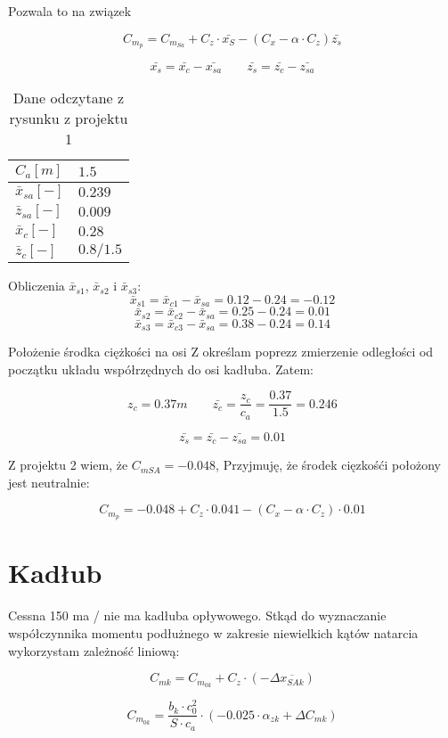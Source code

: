 \documentclass[a4paper, twoside]{report}
\begin{document}
Pozwala to na związek

$$
C_{m_p} = C_{m_{Sa}}+ C_z\cdot \bar{x_S}-(C_x - \alpha \cdot C_z) \bar{z_s} 
$$

$$
\bar{x_s} = \bar{x_c} - \bar{x_{sa}} \qquad \bar{z_s} = \bar{z_c} - \bar{z_{sa}}
$$
\FloatBarrier
\begin{table}[h!]
\centering
\caption{Dane odczytane z rysunku z  projektu 1}
\begin{tabular}{|l|l|} 
\hline
$C_a [m]$         & $1.5$      \\ 
\hline
$\bar x_{sa} [-]$ & $0.239$    \\ 
\hline
$\bar z_{sa} [-]$ & $0.009$    \\ 
\hline
$\bar x_{c} [-]$  & $0.28$     \\ 
\hline
$\bar z_{c} [-]$  & $0.8/1.5$  \\
\hline
\end{tabular}
\end{table}


Obliczenia $\bar{x}_{s1}$, $\bar{x}_{s2}$ i $\bar{x}_{s3}$:
\[
\bar x_{s1} =	\bar x_{c1} -\bar x_ {sa} = 0.12 - 0.24 = -0.12 
\]
\[
\bar x_{s2} =	\bar x_{c2} -\bar x_ {sa} = 0.25 - 0.24 =  0.01
\]
\[
\bar x_{s3} =	\bar x_{c3} -\bar x_ {sa} = 0.38 - 0.24 = 0.14 
\]

Położenie środka ciężkości na osi Z określam poprezz zmierzenie odległości od początku układu współrzędnych do osi kadłuba. Zatem:

$$
z_c = 0.37m \qquad \bar{z_c} =\frac{z_c}{c_a} = \frac{0.37}{1.5} = 0.246
$$

$$
\bar{z_s} = \bar{z_c} - \bar{z_{sa}} = 0.01
$$

Z projektu 2 wiem, że $C_{mSA} = - 0.048$, Przyjmuję, że środek cięzkośći położony jest neutralnie:

$$
C_{m_p} = -0.048+C_z \cdot 0.041 - (C_x - \alpha \cdot C_z)\cdot 0.01
$$

\section{Kadłub} 

Cessna 150 ma / nie ma kadłuba opływowego. Stkąd do wyznaczanie współczynnika momentu podłużnego w zakresie niewielkich kątów natarcia wykorzystam zależność liniową:

$$
C_{mk} = C_{m_{0k}}+ C_z\cdot (-\Delta \overline{x_{SAk}})
$$

$$
C_{m_{0k}} = \frac{b_k\cdot c_0^2}{S\cdot c_a} \cdot (-0.025 \cdot \alpha_{zk}+\Delta C_{mk})
$$
\end{document}
